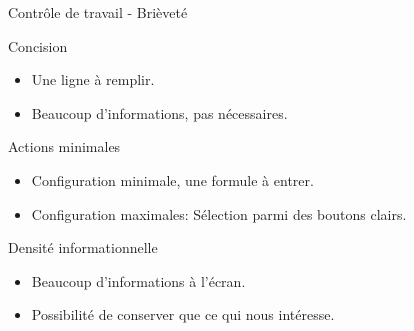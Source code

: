 \begin{frame}{Contrôle de travail - Brièveté}
  \begin{block}{Concision}
    \begin{itemize}
    \item<pro@1-> Une ligne à remplir.
    \item<con@1-> Beaucoup d'informations, pas nécessaires.
    \end{itemize}
  \end{block}

  \begin{block}{Actions minimales}
    \begin{itemize}
    \item<pro@1-> Configuration minimale, une formule à entrer.
    \item Configuration maximales: Sélection parmi des boutons clairs.
    \end{itemize}
  \end{block}

  \begin{block}{Densité informationnelle}
    \begin{itemize}
    \item<con@1-> Beaucoup d'informations à l'écran.
    \item<pro@1-> Possibilité de conserver que ce qui nous intéresse.
    \end{itemize}
  \end{block}
\end{frame}
